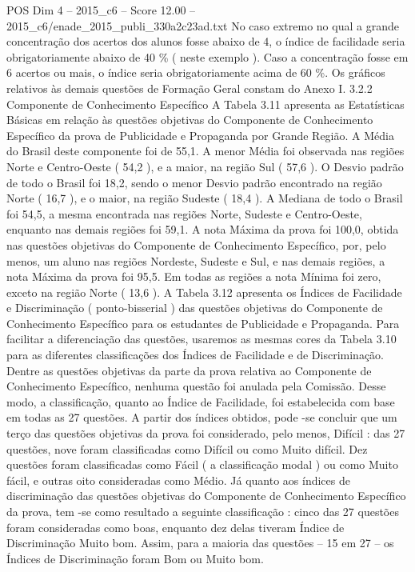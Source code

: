 \begin{textsample}{POS Dim 4 – 2015\_c6 – Score 12.00 – 2015\_c6/enade\_2015\_publi\_330a2c23ad.txt}
No caso extremo no qual a grande concentração dos acertos dos alunos fosse abaixo de 4, o índice de facilidade seria obrigatoriamente abaixo de 40 \% ( neste exemplo ).
Caso a concentração fosse em 6 acertos ou mais, o índice seria obrigatoriamente acima de 60 \%.
Os gráficos relativos às demais questões de Formação Geral constam do Anexo I. 3.2.2 Componente de Conhecimento Específico A Tabela 3.11 apresenta as Estatísticas Básicas em relação às questões objetivas do Componente de Conhecimento Específico da prova de Publicidade e Propaganda por Grande Região.
A Média do Brasil deste componente foi de 55,1.
A menor Média foi observada nas regiões Norte e Centro-Oeste ( 54,2 ), e a maior, na região Sul ( 57,6 ).
O Desvio padrão de todo o Brasil foi 18,2, sendo o menor Desvio padrão encontrado na região Norte ( 16,7 ), e o maior, na região Sudeste ( 18,4 ).
A Mediana de todo o Brasil foi 54,5, a mesma encontrada nas regiões Norte, Sudeste e Centro-Oeste, enquanto nas demais regiões foi 59,1.
A nota Máxima da prova foi 100,0, obtida nas questões objetivas do Componente de Conhecimento Específico, por, pelo menos, um aluno nas regiões Nordeste, Sudeste e Sul, e nas demais regiões, a nota Máxima da prova foi 95,5.
Em todas as regiões a nota Mínima foi zero, exceto na região Norte ( 13,6 ).
A Tabela 3.12 apresenta os Índices de Facilidade e Discriminação ( ponto-bisserial ) das questões objetivas do Componente de Conhecimento Específico para os estudantes de Publicidade e Propaganda.
Para facilitar a diferenciação das questões, usaremos as mesmas cores da Tabela 3.10 para as diferentes classificações dos Índices de Facilidade e de Discriminação.
Dentre as questões objetivas da parte da prova relativa ao Componente de Conhecimento Específico, nenhuma questão foi anulada pela Comissão.
Desse modo, a classificação, quanto ao Índice de Facilidade, foi estabelecida com base em todas as 27 questões.
A partir dos índices obtidos, pode -se concluir que um terço das questões objetivas da prova foi considerado, pelo menos, Difícil : das 27 questões, nove foram classificadas como Difícil ou como Muito difícil.
Dez questões foram classificadas como Fácil ( a classificação modal ) ou como Muito fácil, e outras oito consideradas como Médio.
Já quanto aos índices de discriminação das questões objetivas do Componente de Conhecimento Específico da prova, tem -se como resultado a seguinte classificação : cinco das 27 questões foram consideradas como boas, enquanto dez delas tiveram Índice de Discriminação Muito bom.
Assim, para a maioria das questões – 15 em 27 – os Índices de Discriminação foram Bom ou Muito bom.

\end{textsample}
